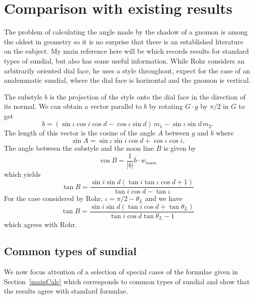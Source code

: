 \documentclass[12pt]{article}
\newcommand{\dt}{\! \cdot \!}
\begin{document}
\section{Comparison with existing results}\label{secComparison}
%
The problem of calculating the angle made by the shadow of a gnomon is among the oldest in geometry so it is no surprise that there is an established literature on the subject. My main reference here will be \cite{Rohr} which records results for standard types of sundial, but \cite{waugh} also has some useful information. While Rohr considers an arbitrarily oriented dial face, he uses a style throughout, expect for the case of an analemmatic sundial, where the dial face is horizontal and the gnomon is vertical.

The substyle $b$ is the projection of the style onto the dial face in the direction of its normal. We can obtain a vector parallel to $b$ by rotating $G \dt g$ by $\pi/2$ in $G$ to get
%
\begin{equation}
b = \left(\sin\iota\cos i\cos d - \cos\iota\sin d\right)\,m_1 - \sin\iota\sin d\,m_2.
\end{equation}
%
The length of this vector is the cosine of the angle $A$ between $g$ and $b$
where
%
\begin{equation}
\sin A = \sin\iota\sin i\cos d + \cos\iota\cos i.
\end{equation}
%
The angle between the substyle and the noon line $B$ is given by
%
\begin{equation}
\cos B = \frac{1}{|b|} b \dt w_{noon}
\end{equation}
%
which yields
%
\begin{equation}
\tan B = \frac{\sin i\sin d \left( \tan i\tan\iota\cos d + 1 \right)}{\tan i\cos d - \tan\iota}
\end{equation}
%
For the case considered by Rohr, $\iota = \pi/2 - \theta_L$ and we have
%
\begin{equation}
\tan B = \frac{\sin i\sin d \left( \tan i\cos d + \tan\theta_L \right)}{\tan i\cos d\tan\theta_L - 1}
\end{equation}
%
which agrees with Rohr.
%
\subsection{Common types of sundial} \label{secCommonTypes}
%
We now focus attention of a selection of special cases of the formulae given in Section~\ref{mainCalc} which corresponds to common types of sundial and show that the results agree with standard formulae.
%
\end{document}
